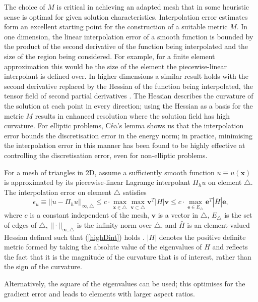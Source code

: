 The choice of $M$ is critical in achieving an adapted mesh that in
some heuristic sense is optimal for given solution characteristics.
Interpolation error estimates form an excellent starting point for the
construction of a suitable metric $M$.  In one dimension, the linear
interpolation error of a smooth function is bounded by the product of
the second derivative of the function being interpolated and the size
of the region being considered. For example, for a finite element
approximation this would be the size of the element the
piecewise-linear interpolant is defined over.  In higher dimensions a
similar result holds with the second derivative replaced by the
Hessian of the function being interpolated, the tensor field of second
partial derivatives \citep{dazevedo1991,george1998,frey2005}. The
Hessian describes the curvature of the solution at each point in every
direction; using the Hessian as a basis for the metric $M$ results in
enhanced resolution where the solution field has high curvature. For
elliptic problems, C\'ea's lemma shows us that the interpolation error
bounds the discretisation error in the energy norm; in practice,
minimising the interpolation error in this manner has been found to be
highly effective at controlling the discretisation error, even for
non-elliptic problems.

For a mesh of triangles in 2D, assume a sufficiently smooth function
$u\equiv u(\pmb{x})$ is approximated by its piecewise-linear Lagrange
interpolant $\Pi_h u$ on element $\triangle$. The interpolation error
on element $\triangle$ satisfies
\begin{equation}
\epsilon_u\equiv ||{u} - \Pi_h{u}||_{\infty,\triangle}
\le c\cdot
\max_{\pmb{x}\in \triangle}\max_{\pmb{v}\subset \triangle} \pmb{v}^T |H| \pmb{v}
\le c \cdot\max_{\pmb{e}\in E_{\triangle}}\pmb{e}^T |\bar{H}| \pmb{e},
\label{highDint}
\end{equation}
where $c$ is a constant independent of the mesh, $\pmb{v}$ is a vector
in $\triangle$, $E_{\triangle}$ is the set of edges of $\triangle$,
$||\cdot||_{\infty,\triangle}$ is the infinity norm over $\triangle$,
and $\bar{H}$ is an element-valued Hessian defined such that
(\ref{highDint}) holds \cite{frey2005}. $|H|$ denotes the positive
definite metric formed by taking the absolute value of the eigenvalues
of ${H}$ and reflects the fact that it is the magnitude of the
curvature that is of interest, rather than the sign of the curvature.

Alternatively, the square of the eigenvalues can be used; this
optimises for the gradient error \citep{dazevedo1991, shewchuk2002}
and leads to elements with larger aspect ratios.

